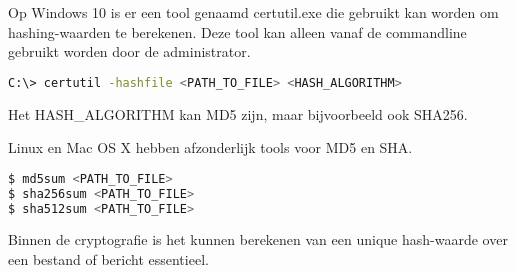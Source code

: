 Op Windows 10 is er een tool genaamd certutil.exe die gebruikt kan worden om hashing-waarden te berekenen. Deze tool kan alleen vanaf de commandline gebruikt worden door de administrator.

\begin{lstlisting}[language=bash]
C:\> certutil -hashfile <PATH_TO_FILE> <HASH_ALGORITHM>
\end{lstlisting}

Het HASH\_ALGORITHM kan MD5 zijn, maar bijvoorbeeld ook SHA256.

Linux en Mac OS X hebben afzonderlijk tools voor MD5 en SHA.
\begin{lstlisting}[language=bash]
$ md5sum <PATH_TO_FILE>
$ sha256sum <PATH_TO_FILE>
$ sha512sum <PATH_TO_FILE>
\end{lstlisting}

Binnen de cryptografie is het kunnen berekenen van een unique hash-waarde over een bestand of bericht essentieel.
